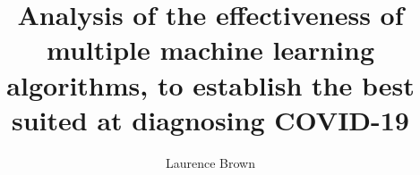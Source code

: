 \author{Laurence Brown}

\title{\bfseries Analysis of the effectiveness of multiple machine learning algorithms, to establish the best suited at diagnosing COVID-19}


